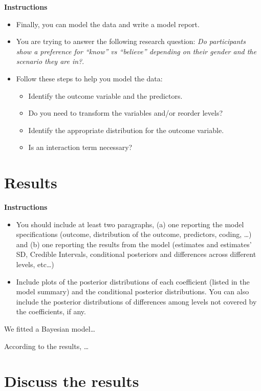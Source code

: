 \documentclass[
]{article}
\providecommand{\tightlist}{%
  \setlength{\itemsep}{0pt}\setlength{\parskip}{0pt}}
\begin{document}
\textbf{Instructions}

\begin{itemize}
\tightlist
\item
  Finally, you can model the data and write a model report.
\item
  You are trying to answer the following research question: \emph{Do
  participants show a preference for ``know'' vs ``believe'' depending
  on their gender and the scenario they are in?}.
\item
  Follow these steps to help you model the data:

  \begin{itemize}
  \tightlist
  \item
    Identify the outcome variable and the predictors.
  \item
    Do you need to transform the variables and/or reorder levels?
  \item
    Identify the appropriate distribution for the outcome variable.
  \item
    Is an interaction term necessary?
  \end{itemize}
\end{itemize}

\section{Results}\label{results}

\textbf{Instructions}

\begin{itemize}
\tightlist
\item
  You should include at least two paragraphs, (a) one reporting the
  model specifications (outcome, distribution of the outcome,
  predictors, coding, \ldots) and (b) one reporting the results from the
  model (estimates and estimates' SD, Credible Intervals, conditional
  posteriors and differences across different levels, etc\ldots)
\item
  Include plots of the posterior distributions of each coefficient
  (listed in the model summary) and the conditional posterior
  distributions. You can also include the posterior distributions of
  differences among levels not covered by the coefficients, if any.
\end{itemize}

We fitted a Bayesian model\ldots{}

According to the results, \ldots{}

\section{Discuss the results}\label{discuss-the-results}
\end{document}
